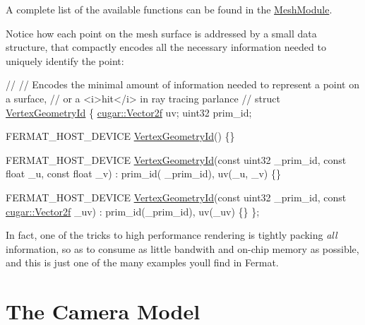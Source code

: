 \begin{DoxyParagraph}{}
A complete list of the available functions can be found in the \hyperlink{group___mesh_module}{Mesh\+Module}. 
\end{DoxyParagraph}
\begin{DoxyParagraph}{}
Notice how each point on the mesh surface is addressed by a small data structure, that compactly encodes all the necessary information needed to uniquely identify the point\+: ~\newline

\begin{DoxyCode}
\textcolor{comment}{// }
\textcolor{comment}{// Encodes the minimal amount of information needed to represent a point on a surface,}
\textcolor{comment}{// or a <i>hit</i> in ray tracing parlance}
\textcolor{comment}{// }
\textcolor{keyword}{struct }\hyperlink{struct_vertex_geometry_id}{VertexGeometryId}
\{
   \hyperlink{structcugar_1_1_vector}{cugar::Vector2f} uv;
   uint32          prim\_id;

   FERMAT\_HOST\_DEVICE
   \hyperlink{struct_vertex_geometry_id}{VertexGeometryId}() \{\}

   FERMAT\_HOST\_DEVICE
   \hyperlink{struct_vertex_geometry_id}{VertexGeometryId}(\textcolor{keyword}{const} uint32 \_prim\_id, \textcolor{keyword}{const} \textcolor{keywordtype}{float} \_u, \textcolor{keyword}{const} \textcolor{keywordtype}{float} \_v) : prim\_id(
      \_prim\_id), uv(\_u, \_v) \{\}

   FERMAT\_HOST\_DEVICE
   \hyperlink{struct_vertex_geometry_id}{VertexGeometryId}(\textcolor{keyword}{const} uint32 \_prim\_id, \textcolor{keyword}{const} \hyperlink{structcugar_1_1_vector}{cugar::Vector2f} \_uv) : 
      prim\_id(\_prim\_id), uv(\_uv) \{\}
\};
\end{DoxyCode}
 
\end{DoxyParagraph}
\begin{DoxyParagraph}{}
In fact, one of the tricks to high performance rendering is tightly packing {\itshape all} information, so as to consume as little bandwith and on-\/chip memory as possible, and this is just one of the many examples you\textquotesingle{}ll find in Fermat.
\end{DoxyParagraph}
\hypertarget{_overture_page_CameraSection}{}\section{The Camera Model}\label{_overture_page_CameraSection}
